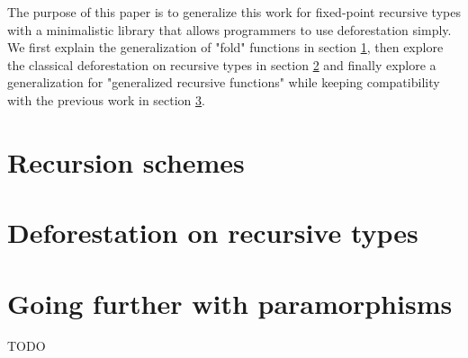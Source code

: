 \documentclass[format=sigplan]{acmart}
\begin{document}
The purpose of this paper is to generalize this work for fixed-point recursive types with a minimalistic library that allows programmers to use deforestation simply. We first explain the generalization of "fold" functions in section \ref{sec:recschemes}, then explore the classical deforestation on recursive types in section \ref{sec:rectypes} and finally explore a generalization for "generalized recursive functions" while keeping compatibility with the previous work in section \ref{sec:para}.

\section{Recursion schemes}
\label{sec:recschemes}


\section{Deforestation on recursive types}
\label{sec:rectypes}


\section{Going further with paramorphisms}
\label{sec:para}


\begin{acks}
TODO
\end{acks}




\end{document}
